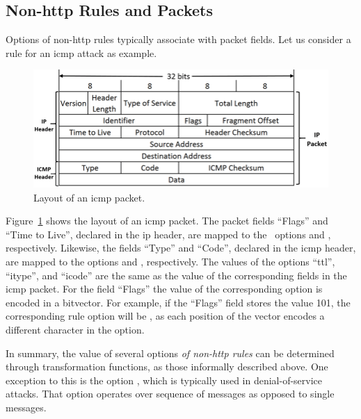 \documentclass[conference]{IEEEtran}
\begin{document}
\subsection{Non-http Rules and Packets}
\label{sec:rules-and-packets}


Options of non-http rules typically associate with packet fields. Let
us consider a rule for an icmp attack as example.

\begin{figure}[h!]
  \centering
  \vspace{-2ex}  
  \includegraphics[scale=0.27]{figs/ICMP-packet-structure.png}
  \vspace{-1ex}
  \caption{Layout of an icmp packet.}
  \vspace{-1ex}
  \label{fig:icmp-packet-layout}
\end{figure}

Figure~\ref{fig:icmp-packet-layout} shows the
layout of an icmp packet. The packet fields ``Flags'' and ``Time to
Live'', declared in the ip header, are mapped to the \suri\ options
 and , respectively. Likewise, the fields
``Type'' and ``Code'', declared in the icmp header, are mapped to the
options  and , respectively. The values of
the options ``ttl'', ``itype'', and ``icode'' are the same as the
value of the corresponding fields in the icmp packet. For the field
``Flags'' the value of the corresponding option is encoded in a
bitvector. For example, if the ``Flags'' field stores the value 101,
the corresponding rule option will be , as each
position of the vector encodes a different character in the
 option.

In summary, the value of several options \emph{of non-http rules} can
be determined through transformation functions, as those informally
described above. One exception to this is the option
, which is typically used in denial-of-service
attacks. That option operates over sequence of messages as opposed to
single messages.
\end{document}
